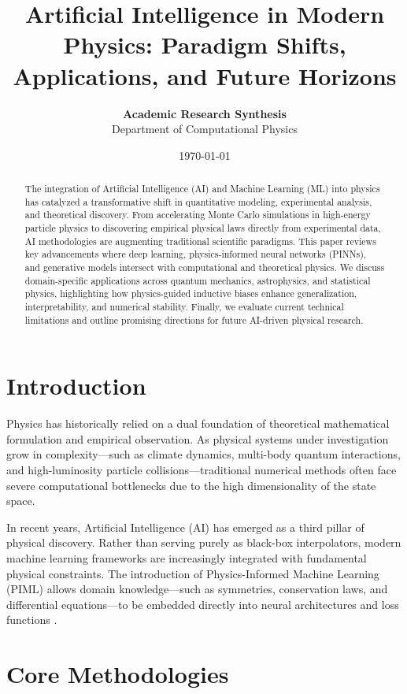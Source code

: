 \documentclass[11pt,a4paper]{article}
\title{\textbf{Artificial Intelligence in Modern Physics: Paradigm Shifts, Applications, and Future Horizons}}
\author{\textbf{Academic Research Synthesis} \\ Department of Computational Physics}
\date{\today}
\begin{document}
\maketitle

\begin{abstract}
The integration of Artificial Intelligence (AI) and Machine Learning (ML) into physics has catalyzed a transformative shift in quantitative modeling, experimental analysis, and theoretical discovery. From accelerating Monte Carlo simulations in high-energy particle physics to discovering empirical physical laws directly from experimental data, AI methodologies are augmenting traditional scientific paradigms. This paper reviews key advancements where deep learning, physics-informed neural networks (PINNs), and generative models intersect with computational and theoretical physics. We discuss domain-specific applications across quantum mechanics, astrophysics, and statistical physics, highlighting how physics-guided inductive biases enhance generalization, interpretability, and numerical stability. Finally, we evaluate current technical limitations and outline promising directions for future AI-driven physical research.
\end{abstract}

\section{Introduction}
Physics has historically relied on a dual foundation of theoretical mathematical formulation and empirical observation. As physical systems under investigation grow in complexity—such as climate dynamics, multi-body quantum interactions, and high-luminosity particle collisions—traditional numerical methods often face severe computational bottlenecks due to the high dimensionality of the state space.

In recent years, Artificial Intelligence (AI) has emerged as a third pillar of physical discovery. Rather than serving purely as black-box interpolators, modern machine learning frameworks are increasingly integrated with fundamental physical constraints. The introduction of Physics-Informed Machine Learning (PIML) allows domain knowledge—such as symmetries, conservation laws, and differential equations—to be embedded directly into neural architectures and loss functions \cite{raissi2019physics}.

\section{Core Methodologies}
\end{document}

